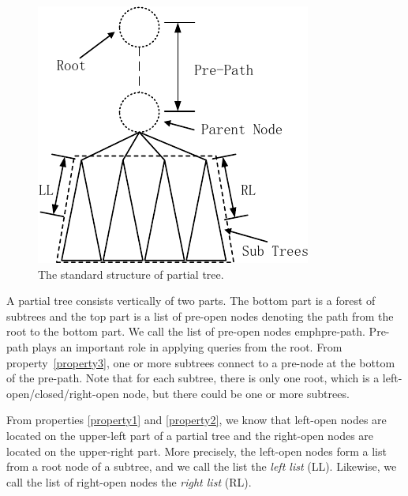 \begin{figure}[t]
\centering\includegraphics{partialtree/figures/fromWord-4.pdf}
\caption{The standard structure of partial tree.}
\label{fig:model}
\end{figure}

A partial tree consists vertically of two parts. The bottom part is a forest
of subtrees and the top part is a list of pre-open nodes denoting the path from
the root to the bottom part. We call the list of pre-open nodes emph{pre-path}.
Pre-path plays an important role in applying queries from the root. From
property~\ref{property3}, one or more subtrees connect to a pre-node at the
bottom of the pre-path. Note that for each subtree, there is only one root,
which is a left-open/closed/right-open node, but there could be one or more
subtrees.

From properties \ref{property1} and \ref{property2}, we know that left-open
nodes are located on the upper-left part of a partial tree and the right-open
nodes are located on the upper-right part. More precisely, the left-open nodes
form a list from a root node of a subtree, and we call the list the \emph{left
list} (LL). Likewise, we call the list of right-open nodes the \emph{right list}
(RL).
